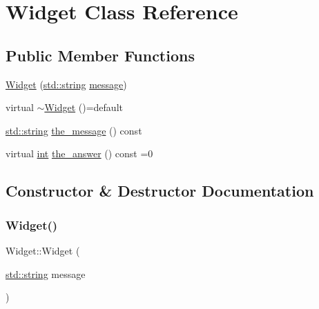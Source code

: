 \hypertarget{class_widget}{}\section{Widget Class Reference}
\label{class_widget}
\subsection*{Public Member Functions}
\begin{DoxyCompactItemize}
\item 
\mbox{\hyperlink{class_widget_ad8a3df2ea55d6c75491fbc200dee4a98}{Widget}} (\mbox{\hyperlink{_s_d_l__opengl__glext_8h_ab4ccfaa8ab0e1afaae94dc96ef52dde1}{std\+::string}} \mbox{\hyperlink{_s_d_l__opengl__glext_8h_a7b6161cffb9b8aee272b3b916183d28c}{message}})
\item 
virtual \mbox{\hyperlink{class_widget_abe38c3c1fbcde4c705d76d58208ceb52}{$\sim$\+Widget}} ()=default
\item 
\mbox{\hyperlink{_s_d_l__opengl__glext_8h_ab4ccfaa8ab0e1afaae94dc96ef52dde1}{std\+::string}} \mbox{\hyperlink{class_widget_abd155dd94b1576e39312bf5999518622}{the\+\_\+message}} () const
\item 
virtual \mbox{\hyperlink{warnings_8h_a74f207b5aa4ba51c3a2ad59b219a423b}{int}} \mbox{\hyperlink{class_widget_a30a0f7c911d2e945e1cb5bb9d1d28c92}{the\+\_\+answer}} () const =0
\end{DoxyCompactItemize}


\subsection{Constructor \& Destructor Documentation}
\mbox{\label{class_widget_ad8a3df2ea55d6c75491fbc200dee4a98}} 
\subsubsection{\texorpdfstring{Widget()}{Widget()}}
{\footnotesize\ttfamily Widget\+::\+Widget (\begin{DoxyParamCaption}\item[{\mbox{\hyperlink{_s_d_l__opengl__glext_8h_ab4ccfaa8ab0e1afaae94dc96ef52dde1}{std\+::string}}}]{message }\end{DoxyParamCaption})\hspace{0.3cm}{\ttfamily [inline]}}


